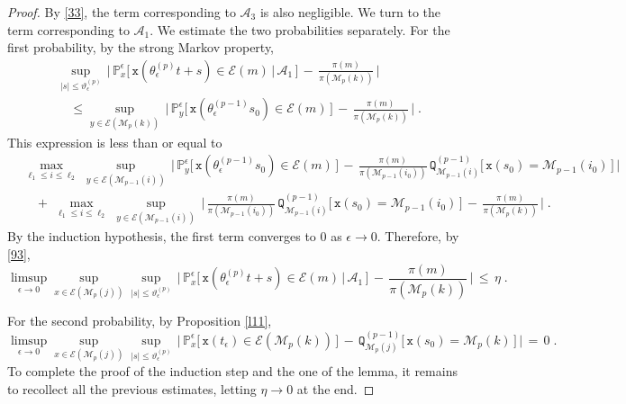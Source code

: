 \documentclass[10pt,a4paper]{amsart}
\newcommand{\bb}[1]{{\mathbb #1}}
\newcommand{\ms}[1]{{\mathscr #1}}
\newcommand{\mtt}[1]{{\mathtt #1}}
\begin{document}
\begin{proof}
By \eqref{33}, the term corresponding to $\mathscr{A}_{3}$ is also
negligible.  We turn to the term corresponding to
$\mathscr{A}_{1}$. We estimate the two probabilities separately. For
the first probability, by the strong Markov property,
\begin{align*}
& \sup_{|s|\le\vartheta^{(p)}_\epsilon}\, \Big|\,
\bb P_x^{\epsilon } \big[\, \mtt x
(\theta_{\epsilon}^{(p)}t+s) \in \ms E(m)
\,\big|\,\mathscr{A}_1 \,\big]
\,-\, \frac{\pi(m)}{\pi(\ms M_{p}(k))}
\, \Big|
\\
&\quad \le
\sup_{y\in \ms E(\ms M_p(k))}\, \Big|\,
\bb P_y^{\epsilon } \big[\, \mtt x
(\theta_{\epsilon}^{(p-1)}s_0) \in \ms E(m) \,\big]
\,-\, \frac{\pi(m)}{\pi(\ms M_{p}(k))}
\, \Big|\;.
\end{align*}
This expression is less than or equal to
\begin{align*}
& \max_{\ell_1\le i\le \ell_2}\, \sup_{y\in \ms E(\ms M_{p-1}(i))}
\,\Big|\, \bb P_y^{\epsilon } \big[\, \mtt x
(\theta_{\epsilon}^{(p-1)}s_0) \in \ms E(m) \,\big]
\,-\, \frac{\pi(m)}{\pi(\ms M_{p-1}(i_0))} 
\, \mtt Q^{(p-1)}_{\ms M_{p-1}(i)} \big[\,
\mtt x (s_{0}) = \ms M_{p-1}(i_0) \,\big] \,\Big|
\\
& \quad +\, \max_{\ell_1\le i\le \ell_2}\, \sup_{y\in \ms E(\ms M_{p-1}(i))}
\,\Big|\, \frac{\pi(m)}{\pi(\ms M_{p-1}(i_0))} 
\, \mtt Q^{(p-1)}_{\ms M_{p-1}(i)} \big[\,
\mtt x (s_{0}) = \ms M_{p-1}(i_0) \,\big]
\,-\,  \frac{\pi(m)}{\pi(\ms M_{p}(k))} \,\Big|\;.
\end{align*}
By the induction hypothesis, the first term converges to $0$ as
$\epsilon\to0$.  Therefore, by \eqref{93},
\begin{equation*}
\limsup_{\epsilon\to0}  \sup_{x \in\mathcal{E}(\ms M_p(j))}
\sup_{|s|\le\vartheta^{(p)}_\epsilon}\, \Big|\,
\bb P_x^{\epsilon } \big[\, \mtt x
(\theta_{\epsilon}^{(p)}t+s) \in \ms E(m)
\,\big|\,\mathscr{A}_1 \,\big]
\,-\, \frac{\pi(m)}{\pi(\ms M_{p}(k))}
\, \Big| \,\le\, \eta\;.
\end{equation*}

For the second probability, by Proposition \ref{l11},
\begin{equation*}
\limsup_{\epsilon\to0}  \sup_{x \in\mathcal{E}(\ms M_p(j))}
\sup_{|s|\le\vartheta^{(p)}_\epsilon}\, \Big|\,
\bb P_x^{\epsilon } \big[\, \mtt x (t_{\epsilon}) \in \ms E(\ms
M_{p}(k))  \,\big]
\,-\, \mtt Q^{(p-1)}_{\ms M_{p}(j)} \big[\,
\mtt x (s_{0}) = \ms M_{p}(k) \,\big]
\, \Big| \,=\, 0\;.
\end{equation*}
To complete the proof of the induction step and the one of the lemma,
it remains to recollect all the previous estimates, letting $\eta\to 0$
at the end.
\end{proof}
\end{document}
